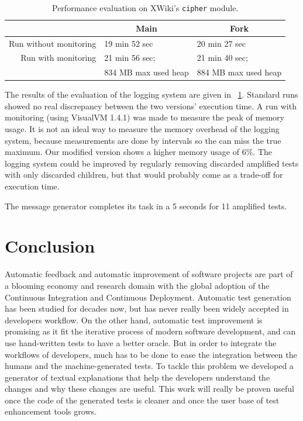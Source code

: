 \documentclass[a4paper,11pt]{sdm_internship}
\theoremstyle{definition}
\begin{document}
\begin{table}
  \centering
  \begin{tabular}{rll}
    \toprule
    \multicolumn{1}{c}{} & \multicolumn{1}{c}{\textbf{Main}} & \multicolumn{1}{c}{\textbf{Fork}} \\
    \midrule
    Run without monitoring & 19 min 52 sec & 20 min 27 sec \\
    Run with monitoring & 21 min 56 sec; & 21 min 40 sec; \\
      & 834 MB max used heap & 884 MB max used heap \\
    \bottomrule
  \end{tabular}
  \caption{Performance evaluation on XWiki's \texttt{cipher} module\protect\footnotemark.}%
  \label{tab:perf_exp}
\end{table}

The results of the evaluation of the logging system are given in \tablename~\ref{tab:perf_exp}.
Standard runs showed no real discrepancy between the two versions' execution time.
A run with monitoring (using VisualVM 1.4.1) was made to measure the peak of memory usage.
It is not an ideal way to measure the memory overhead of the logging system, because measurements are done by intervals so the can miss the true maximum.
Our modified version shows a higher memory usage of 6\%.
The logging system could be improved by regularly removing discarded amplified tests with only discarded children, but that would probably come as a trade-off for execution time.

The message generator completes its task in a 5 seconds for 11 amplified tests.


\section*{Conclusion}%
\label{sec:conclu}%
Automatic feedback and automatic improvement of software projects are part of a blooming economy and research domain with the global adoption of the Continuous Integration and Continuous Deployment.
Automatic test generation has been studied for decades now, but has never really been widely accepted in developers workflow.
On the other hand, automatic test improvement is promising as it fit the iterative process of modern software development, and can use hand-written tests to have a better oracle.
But in order to integrate the workflows of developers, much has to be done to ease the integration between the humans and the machine-generated tests.
To tackle this problem we developed a generator of textual explanations that help the developers understand the changes and why these changes are useful.
This work will really be proven useful once the code of the generated tests is cleaner and once the user base of test enhancement tools grows.
\end{document}

